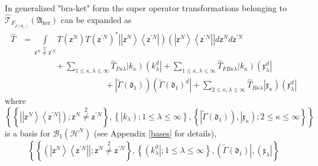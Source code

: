 \documentclass[aps,preprint]{revtex4}%
\begin{document}
In generalized "bra-ket" form the super operator transformations belonging to
$\mathcal{\hat{T}}_{F_{\tilde{\Gamma}\left(  \mathfrak{d}_{1}\right)  }%
}\left(  \mathfrak{A}_{\ker}\right)  $ can be expanded as
\begin{align}
\hat{T}  &  =%
{\displaystyle\int\limits_{\mathsf{z}^{N}\overset{2}{\neq}\mathsf{z}^{\prime
N}}}
T\left(  \mathsf{z}^{N}\right)  T\left(  \mathsf{z}^{\prime N}\right)  ^{\ast
}\left\vert \left\vert \mathsf{z}^{N}\right\rangle \left\langle \mathsf{z}%
^{\prime N}\right\vert \right)  \left(  \left\vert \mathsf{z}^{N}\right\rangle
\left\langle \mathsf{z}^{\prime N}\right\vert \right\vert d\mathsf{z}%
^{N}d\mathsf{z}^{\prime N}\nonumber\\
&  \qquad\qquad+%
{\displaystyle\sum\limits_{1\leq\kappa,\lambda\leq\infty}}
\hat{T}_{F\kappa\lambda}\left\vert k_{\kappa}\right)  \left(  k_{\lambda}%
^{d}\right\vert +%
{\displaystyle\sum\limits_{1\leq\kappa,\lambda\leq\infty}}
\hat{T}_{FB\kappa\lambda}\left\vert k_{\kappa}\right)  \left(  \mathfrak{x}%
_{\lambda}^{d}\right\vert \nonumber\\
&  \qquad\qquad\qquad\qquad\qquad+\left\vert \tilde{\Gamma}\left(
\mathfrak{d}_{1}\right)  \right)  \left(  \tilde{\Gamma}\left(  \mathfrak{d}%
_{1}\right)  ^{d}\right\vert +%
{\displaystyle\sum\limits_{2\leq\kappa,\lambda\leq\infty}}
\hat{T}_{B\kappa\lambda}\left\vert \mathfrak{x}_{\kappa}\right)  \left(
\mathfrak{x}_{\lambda}^{d}\right\vert \label{bk}%
\end{align}
where
\begin{equation}
\left\{  \left\{  \left\vert \left\vert \mathsf{z}^{N}\right\rangle
\left\langle \mathsf{z}^{\prime N}\right\vert \right)  ;\mathsf{z}^{N}%
\overset{2}{\neq}\mathsf{z}^{\prime N}\right\}  ,\left\{  \left\vert
k_{\lambda}\right)  ;1\leq\lambda\leq\infty\right\}  ,\left\{  \left\vert
\tilde{\Gamma}\left(  \mathfrak{d}_{1}\right)  \right)  ,\left\vert
\mathfrak{x}_{\kappa}\right)  ;2\leq\kappa\leq\infty\right\}  \right\}
\end{equation}
is a basis for $\mathcal{B}_{1}\left(  \mathcal{H}^{N}\right)  $ (see Appendix
\ref{bases} for details),
\begin{equation}
\left\{  \left\{  \left(  \left\vert \mathsf{z}^{N}\right\rangle \left\langle
\mathsf{z}^{\prime N}\right\vert \right\vert ;\mathsf{z}^{N}\overset{2}{\neq
}\mathsf{z}^{\prime N}\right\}  ,\left\{  \left(  k_{\lambda}^{d}\right\vert
;1\leq\lambda\leq\infty\right\}  ,\left(  \tilde{\Gamma}\left(  \mathfrak{d}%
_{1}\right)  \right\vert ,\left(  \mathfrak{x}_{\lambda}\right\vert \right\}
\end{equation}
\end{document}
